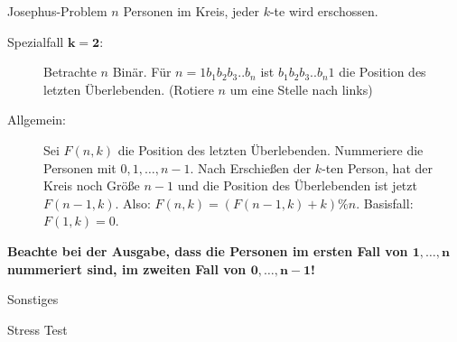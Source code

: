 \begin{algorithm}{Josephus-Problem}
	$n$ Personen im Kreis, jeder $k$-te wird erschossen.
	\begin{description}
		\item[Spezialfall $\boldsymbol{k=2}$:] Betrachte $n$ Binär.
		Für $n = 1b_1b_2b_3..b_n$ ist $b_1b_2b_3..b_n1$ die Position des letzten Überlebenden.
		(Rotiere $n$ um eine Stelle nach links)
	\end{description}
	
	\begin{description}
		\item[Allgemein:] Sei $F(n,k)$ die Position des letzten Überlebenden.
		Nummeriere die Personen mit $0, 1, \ldots, n-1$.
		Nach Erschießen der $k$-ten Person, hat der Kreis noch Größe $n-1$ und die Position des Überlebenden ist jetzt $F(n-1,k)$.
		Also: $F(n,k) = (F(n-1,k)+k)\%n$. Basisfall: $F(1,k) = 0$.
	\end{description}
	\textbf{Beachte bei der Ausgabe, dass die Personen im ersten Fall von $\boldsymbol{1, \ldots, n}$ nummeriert sind, im zweiten Fall von $\boldsymbol{0, \ldots, n-1}$!}
\end{algorithm}

\begin{algorithm}{Sonstiges}
\end{algorithm}

\begin{algorithm}{Stress Test}
\end{algorithm}

